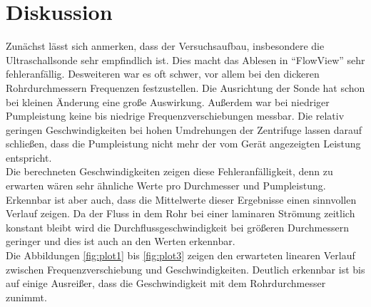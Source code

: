 \section{Diskussion}
Zunächst lässt sich anmerken, dass der Versuchsaufbau, insbesondere die Ultraschallsonde sehr empfindlich ist. Dies macht das Ablesen in \enquote{FlowView} sehr fehleranfällig. Desweiteren war es 
oft schwer, vor allem bei den dickeren Rohrdurchmessern Frequenzen festzustellen. Die Ausrichtung der Sonde hat schon bei kleinen Änderung eine große Auswirkung. Außerdem war bei niedriger Pumpleistung
keine bis niedrige Frequenzverschiebungen messbar. Die relativ geringen Geschwindigkeiten bei hohen Umdrehungen der Zentrifuge lassen darauf schließen, dass die Pumpleistung nicht mehr der vom Gerät angezeigten Leistung entspricht.
\\
\newline
Die berechneten Geschwindigkeiten zeigen diese Fehleranfälligkeit, denn zu erwarten wären sehr ähnliche Werte pro Durchmesser und Pumpleistung. Erkennbar ist aber auch, dass die Mittelwerte dieser Ergebnisse 
einen sinnvollen Verlauf zeigen. Da der Fluss in dem Rohr bei einer laminaren Strömung zeitlich konstant bleibt wird die Durchflussgeschwindigkeit bei größeren Durchmessern geringer und dies ist auch an den Werten erkennbar.
\\
\newline
Die Abbildungen \ref{fig:plot1} bis \ref{fig:plot3} zeigen den erwarteten linearen Verlauf zwischen Frequenzverschiebung und Geschwindigkeiten. Deutlich erkennbar ist bis auf einige Ausreißer, dass die Geschwindigkeit mit dem Rohrdurchmesser
zunimmt.



